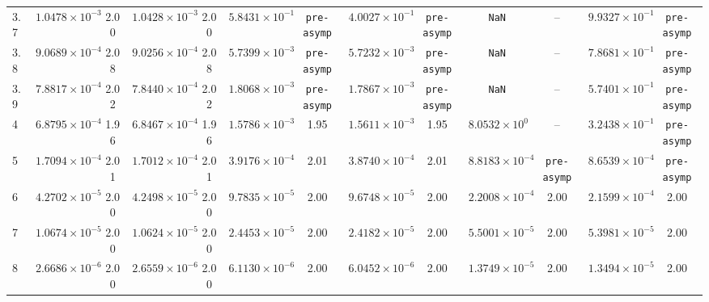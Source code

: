\begin{table}
{\begin{tabular}{l cc cc cc cc cc cc}
3.7 & $1.0478\times10^{-3}$ & 2.00 & $1.0428\times10^{-3}$ & 2.00 & $5.8431\times10^{-1}$ & \texttt{pre-asymp} & $4.0027\times10^{-1}$ & \texttt{pre-asymp} & \texttt{NaN} & -- & $9.9327\times10^{-1}$ & \texttt{pre-asymp} \\
3.8 & $9.0689\times10^{-4}$ & 2.08 & $9.0256\times10^{-4}$ & 2.08 & $5.7399\times10^{-3}$ & \texttt{pre-asymp} & $5.7232\times10^{-3}$ & \texttt{pre-asymp} & \texttt{NaN} & -- & $7.8681\times10^{-1}$ & \texttt{pre-asymp} \\
3.9 & $7.8817\times10^{-4}$ & 2.02 & $7.8440\times10^{-4}$ & 2.02 & $1.8068\times10^{-3}$ & \texttt{pre-asymp} & $1.7867\times10^{-3}$ & \texttt{pre-asymp} & \texttt{NaN} & -- & $5.7401\times10^{-1}$ & \texttt{pre-asymp} \\
4 & $6.8795\times10^{-4}$ & 1.96 & $6.8467\times10^{-4}$ & 1.96 & $1.5786\times10^{-3}$ & 1.95 & $1.5611\times10^{-3}$ & 1.95 & $8.0532\times10^{0}$ & -- & $3.2438\times10^{-1}$ & \texttt{pre-asymp} \\
5 & $1.7094\times10^{-4}$ & 2.01 & $1.7012\times10^{-4}$ & 2.01 & $3.9176\times10^{-4}$ & 2.01 & $3.8740\times10^{-4}$ & 2.01 & $8.8183\times10^{-4}$ & \texttt{pre-asymp} & $8.6539\times10^{-4}$ & \texttt{pre-asymp} \\
6 & $4.2702\times10^{-5}$ & 2.00 & $4.2498\times10^{-5}$ & 2.00 & $9.7835\times10^{-5}$ & 2.00 & $9.6748\times10^{-5}$ & 2.00 & $2.2008\times10^{-4}$ & 2.00 & $2.1599\times10^{-4}$ & 2.00 \\
7 & $1.0674\times10^{-5}$ & 2.00 & $1.0624\times10^{-5}$ & 2.00 & $2.4453\times10^{-5}$ & 2.00 & $2.4182\times10^{-5}$ & 2.00 & $5.5001\times10^{-5}$ & 2.00 & $5.3981\times10^{-5}$ & 2.00 \\
8 & $2.6686\times10^{-6}$ & 2.00 & $2.6559\times10^{-6}$ & 2.00 & $6.1130\times10^{-6}$ & 2.00 & $6.0452\times10^{-6}$ & 2.00 & $1.3749\times10^{-5}$ & 2.00 & $1.3494\times10^{-5}$ & 2.00 \\
\bottomrule
\end{tabular}}
\end{table}
